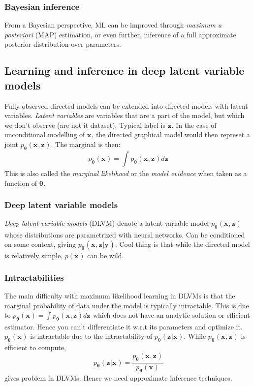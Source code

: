 \documentclass{article}
\begin{document}
\subsubsection{Bayesian inference}
From a Bayesian perspective, ML can be improved
through \textit{maximum a posteriori} (MAP) estimation,
or even further, inference of a full approximate posterior distribution over parameters.

\subsection{Learning and inference in deep latent variable models}
Fully observed directed models can be extended into
directed models with latent variables.
\textit{Latent variables} are variables that are a part of the model,
but which we don't observe (are not it dataset).
Typical label is $ \bm{z}_{}  $.
In the case of unconditional modelling of $ \bm{x}_{}  $,
the directed graphical model would then represet
a joint $ p_{ \bm{\theta}_{} } (\bm{x}_{}, \bm{z}_{})  $.
The marginal is then:
\begin{equation}
		p_{ \bm{\theta}_{} } (\bm{x}_{}) = 
		\int_{}^{} p_{ \bm{\theta}_{} } (\bm{x}_{}, \bm{z}_{}) d\bm{z}_{}
\end{equation}
This is also called the \textit{marginal likelihood} or 
the \textit{model evidence} when taken as a function of $ \bm{\theta}_{}  $.

\subsubsection{Deep latent variable models}
\textit{Deep latent variable models} (DLVM) denote a latent variable
model $  p_{ \bm{\theta}_{} } (\bm{x}_{}, \bm{z}_{})    $
whose distributions are parametrized with neural networks.
Can be conditioned on some context, giving
$   p_{ \bm{\theta}_{} } (\bm{x}_{}, \bm{z}_{}|\bm{y}_{})      $.
Cool thing is that while the directed model is relatively simple,
$ p (\bm{x}_{})  $ can be wild.

\subsubsection{Intractabilities}
The main difficulty with maximum likelihood learning in DLVMs
is that the marginal probability of data under the model
is typically intractable.
This is due to $ p_{ \bm{\theta}_{} } (\bm{x}_{}) = \int_{}^{} p_{ \bm{\theta}_{} } (\bm{x}_{}, \bm{z}_{}) d\bm{z}_{}  $
which does not have an analytic solution or efficient estimator.
Hence you can't differentiate it w.r.t its parameters and optimize it.
$ p_{ \bm{\theta}_{} } (\bm{x}_{})  $ is intractable due to
the intractability of $ p_{ \bm{\theta}_{} } (\bm{z}_{}|\bm{x}_{})  $.
While $ p_{ \bm{\theta}_{} } (\bm{x}_{}, \bm{z}_{})  $ is efficient to compute,
\begin{equation}
		 p_{ \bm{\theta}_{} } (\bm{z}_{}|\bm{x}_{})   = 
		 \frac{ p_{ \bm{\theta}_{} } (\bm{x}_{}, \bm{z}_{})  }{p_{ \bm{\theta}_{} } (\bm{x}_{})} 
\end{equation}
gives problem in DLVMs.
Hence we need approximate inference techniques.
\end{document}
